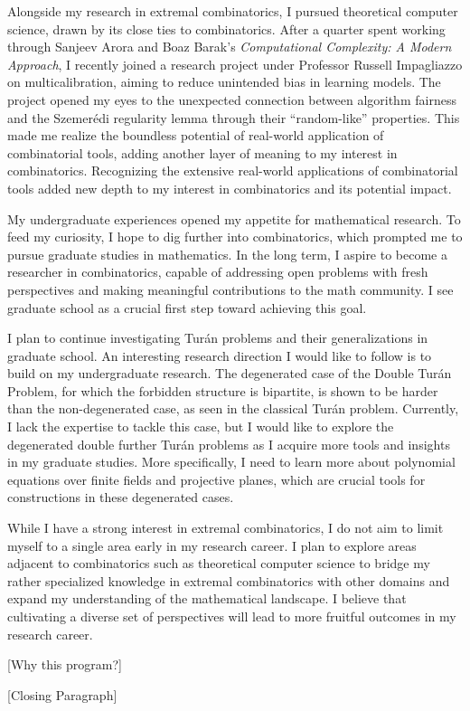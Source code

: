 \documentclass[12pt]{article}
\begin{document}
Alongside my research in extremal combinatorics, I pursued theoretical computer science, drawn by
its close ties to combinatorics. After a quarter spent working through Sanjeev Arora and Boaz
Barak's \textit{Computational Complexity: A Modern Approach}, I recently joined a research project
under Professor Russell Impagliazzo on multicalibration, aiming to reduce unintended bias in
learning models. The project opened my eyes to the unexpected connection between algorithm fairness
and the Szemerédi regularity lemma through their ``random-like'' properties. This made me realize
the boundless potential of real-world application of combinatorial tools, adding another layer of
meaning to my interest in combinatorics. Recognizing the extensive real-world applications of
combinatorial tools added new depth to my interest in combinatorics and its potential impact. 

My undergraduate experiences opened my appetite for mathematical research. To feed my curiosity, I
hope to dig further into combinatorics, which prompted me to pursue graduate studies in mathematics.
In the long term, I aspire to become a researcher in combinatorics, capable of addressing open
problems with fresh perspectives and making meaningful contributions to the math community. I see
graduate school as a crucial first step toward achieving this goal.

I plan to continue investigating Turán problems and their generalizations in graduate school. An
interesting research direction I would like to follow is to build on my undergraduate research. The
degenerated case of the Double Turán Problem, for which the forbidden structure is bipartite, is
shown to be harder than the non-degenerated case, as seen in the classical Turán problem. Currently,
I lack the expertise to tackle this case, but I would like to explore the degenerated double further
Turán problems as I acquire more tools and insights in my graduate studies. More specifically, I
need to learn more about polynomial equations over finite fields and projective planes, which are
crucial tools for constructions in these degenerated cases.

While I have a strong interest in extremal combinatorics, I do not aim to limit myself to a
single area early in my research career. I plan to explore areas adjacent to combinatorics such as
theoretical computer science to bridge my rather specialized knowledge in extremal
combinatorics with other domains and expand my understanding of the mathematical landscape. I
believe that cultivating a diverse set of perspectives will lead to more fruitful outcomes in my
research career.

[Why this program?]

[Closing Paragraph]
\end{document}
